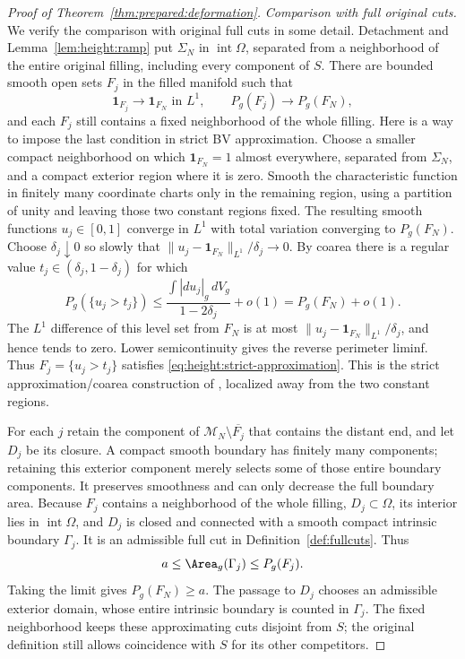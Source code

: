 \begin{proof}[Proof of Theorem~\ref{thm:prepared:deformation}]
\medskip\noindent\emph{Comparison with full original cuts.} We verify the comparison with original full cuts in some detail.
Detachment and Lemma~\ref{lem:height:ramp} put $\Sigma_N$ in
$\operatorname{int}\Omega$, separated from a neighborhood of the
entire original filling, including every component of $S$.  There are
bounded smooth open sets $F_j$ in the filled manifold such that
\begin{equation}\label{eq:height:strict-approximation}
 \mathbf1_{F_j}\longrightarrow\mathbf1_{F_N}\text{ in }L^1,
 \qquad P_g(F_j)\longrightarrow P_g(F_N),
\end{equation}
and each $F_j$ still contains a fixed neighborhood of the whole filling.
Here is a way to impose the last condition in strict BV approximation.
Choose a smaller compact neighborhood on which $\mathbf1_{F_N}=1$
almost everywhere, separated from $\Sigma_N$, and a compact exterior
region where it is zero.  Smooth the characteristic function in finitely
many coordinate charts only in the remaining region, using a partition
of unity and leaving those two constant regions fixed.  The resulting
smooth functions $u_j\in[0,1]$ converge in $L^1$ with total variation
converging to $P_g(F_N)$.  Choose $\delta_j\downarrow0$ so slowly that
$\|u_j-\mathbf1_{F_N}\|_{L^1}/\delta_j\to0$.  By coarea there is a
regular value $t_j\in(\delta_j,1-\delta_j)$ for which
\[
 P_g(\{u_j>t_j\})
 \le\frac{\int|du_j|_g\,dV_g}{1-2\delta_j}+o(1)
 =P_g(F_N)+o(1).
\]
The $L^1$ difference of this level set from $F_N$ is at most
$\|u_j-\mathbf1_{F_N}\|_{L^1}/\delta_j$, and hence tends to zero.
Lower semicontinuity gives the reverse perimeter liminf.  Thus
$F_j=\{u_j>t_j\}$ satisfies
\eqref{eq:height:strict-approximation}.  This is the strict
approximation/coarea construction of \cite{AFP}, localized away from
the two constant regions.

For each $j$ retain the component of $\mathcal M_N\setminus\overline{F_j}$
that contains the distant end, and let $D_j$ be its closure.  A compact
smooth boundary has finitely many components; retaining this exterior
component merely selects some of those entire boundary components.
It preserves smoothness and can only decrease the full boundary area.
Because $F_j$ contains a neighborhood of the whole filling,
$D_j\subset\Omega$, its interior lies in $\operatorname{int}\Omega$,
and $D_j$ is closed and connected with a smooth compact intrinsic
boundary $\Gamma_j$.  It is an admissible full cut in
Definition~\ref{def:fullcuts}.  Thus
\[
 a\le\Area_g(\Gamma_j)\le P_g(F_j).
\]
Taking the limit gives $P_g(F_N)\ge a$.  The passage to $D_j$ chooses
an admissible exterior domain, whose entire intrinsic boundary is
counted in $\Gamma_j$.  The fixed neighborhood keeps these approximating
cuts disjoint from $S$; the original definition still allows coincidence
with $S$ for its other competitors.


\end{proof}
